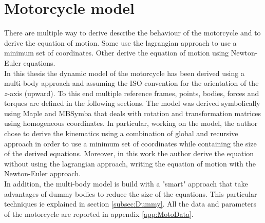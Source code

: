 \chapter{Motorcycle model} 
\label{Ch:MotorcycleModel}
%
There are multiple way to derive describe the behaviour of the motorcycle and to derive the equation of motion. Some use the lagrangian approach to use a minimum set of coordinates\cite{pacejka2006tyre,sharp2004advances,leonelli2019optimal}. Other derive the equation of motion using Newton-Euler equations.\\
In this thesis the dynamic model of the motorcycle has been derived using a multi-body approach and assuming the ISO convention for the orientation of the $z$-axis (upward). To this end multiple reference frames, points, bodies, forces and torques are defined in the following sections. The model was derived symbolically using Maple and MBSymba that deals with rotation and transformation matrices using homogeneous coordinates. In particular, working on the model, the author chose to derive the kinematics using a combination of global and recursive approach in order to use a minimum set of coordinates while containing the size of the derived equations. Moreover, in this work the author derive the equation without using the lagrangian approach, writing the equation of motion with the Newton-Euler approach.\\
In addition, the multi-body model is build with a "smart" approach that take advantages of dummy bodies to reduce the size of the equations. This particular techniques ie explained in section \ref{subsec:Dummy}. All the data and parameters of the motorcycle are reported in appendix \ref{app:MotoData}.
% 



